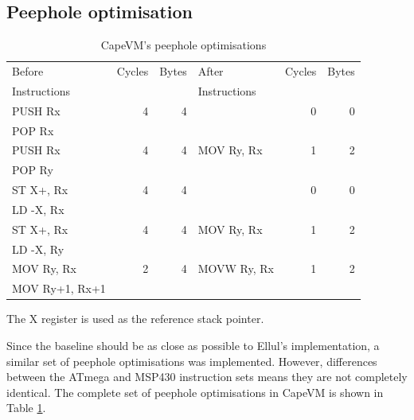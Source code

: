 \subsection{Peephole optimisation}
\begin{table}
\caption{CapeVM's peephole optimisations}
\label{tbl-CapeVM-peephole}
    \begin{threeparttable}
    \begin{tabular}{lrrlrr} %
    \toprule
    Before         & Cycles & Bytes   & After        & Cycles & Bytes   \\
    Instructions   &        &         & Instructions &        &         \\
    \midrule
    \midrule
    PUSH Rx        & 4      & 4       &              & 0      & 0 \\
    POP Rx         &        &         &              &        & \\
    \midrule
    PUSH Rx        & 4      & 4       & MOV Ry, Rx   & 1      & 2 \\
    POP Ry         &        &         &              &        & \\
    \midrule
    ST X+, Rx      & 4      & 4       &              & 0      & 0 \\
    LD -X, Rx      &        &         &              &        & \\
    \midrule
    ST X+, Rx      & 4      & 4       & MOV Ry, Rx   & 1      & 2 \\
    LD -X, Ry      &        &         &              &        & \\
    \midrule
    MOV Ry, Rx     & 2      & 4       & MOVW Ry, Rx  & 1      & 2 \\
    MOV Ry+1, Rx+1 &        &         &              &        & \\
    \bottomrule
    \end{tabular}
    \begin{tablenotes}
    \item The X register is used as the reference stack pointer.
    \end{tablenotes}
    \end{threeparttable}
\end{table}

Since the baseline should be as close as possible to Ellul's implementation, a similar set of peephole optimisations was implemented. However, differences between the ATmega and MSP430 instruction sets means they are not completely identical. The complete set of peephole optimisations in CapeVM is shown in Table \ref{tbl-CapeVM-peephole}.

